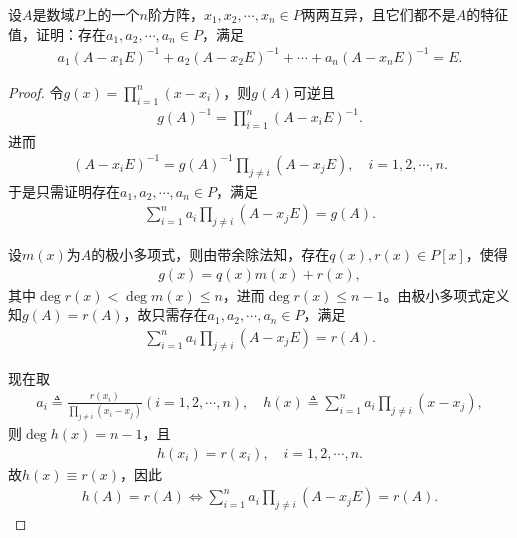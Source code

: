 \documentclass[../../main.tex]{subfiles}%
\begin{document}
\begin{example}
设$A$是数域$P$上的一个$n$阶方阵，$x_1,x_2,\cdots,x_n\in P$两两互异，且它们都不是$A$的特征值，证明：存在$a_1,a_2,\cdots,a_n\in P$，满足
\begin{align*}
a_1\left( A-x_1E \right) ^{-1}+a_2\left( A-x_2E \right) ^{-1}+\cdots +a_n\left( A-x_nE \right) ^{-1}=E.
\end{align*}
\end{example}
\begin{proof}令$g\left( x \right) =\prod\limits_{i=1}^n{\left( x-x_i \right)}$，则$g\left( A \right)$可逆且
\begin{align*}
g\left( A \right) ^{-1}=\prod\limits_{i=1}^n{\left( A-x_iE \right) ^{-1}}.
\end{align*}
进而
\begin{align*}
\left( A-x_iE \right) ^{-1}=g\left( A \right) ^{-1}\prod\limits_{j\ne i}{\left( A-x_jE \right)},\quad i=1,2,\cdots ,n.
\end{align*}
于是只需证明存在$a_1,a_2,\cdots ,a_n\in P$，满足
\begin{align*}
\sum\limits_{i=1}^n{a_i\prod\limits_{j\ne i}{\left( A-x_jE \right)}}=g\left( A \right).
\end{align*}

设$m\left( x \right)$为$A$的极小多项式，则由带余除法知，存在$q\left( x \right) ,r\left( x \right) \in P\left[ x \right]$，使得
\begin{align*}
g\left( x \right) =q\left( x \right) m\left( x \right) +r\left( x \right),
\end{align*}
其中$\deg r\left( x \right) <\deg m\left( x \right) \leqslant n$，进而$\deg r\left( x \right) \leqslant n-1$。由极小多项式定义知$g\left( A \right) =r\left( A \right)$，故只需存在$a_1,a_2,\cdots ,a_n\in P$，满足
\begin{align*}
\sum\limits_{i=1}^n{a_i\prod\limits_{j\ne i}{\left( A-x_jE \right)}}=r\left( A \right).
\end{align*}

现在取
\begin{align*}
a_i\triangleq \frac{r\left( x_i \right)}{\prod\limits_{j\ne i}{\left( x_i-x_j \right)}}\left( i=1,2,\cdots ,n \right),\quad h\left( x \right) \triangleq \sum\limits_{i=1}^n{a_i\prod\limits_{j\ne i}{\left( x-x_j \right)}},
\end{align*}
则$\deg h\left( x \right) =n-1$，且
\begin{align*}
h\left( x_i \right) =r\left( x_i \right),\quad i=1,2,\cdots ,n.
\end{align*}
故$h\left( x \right) \equiv r\left( x \right)$，因此
\begin{align*}
h\left( A \right) =r\left( A \right) \Longleftrightarrow \sum\limits_{i=1}^n{a_i\prod\limits_{j\ne i}{\left( A-x_jE \right)}}=r\left( A \right).
\end{align*}
\end{proof}
\end{document}
